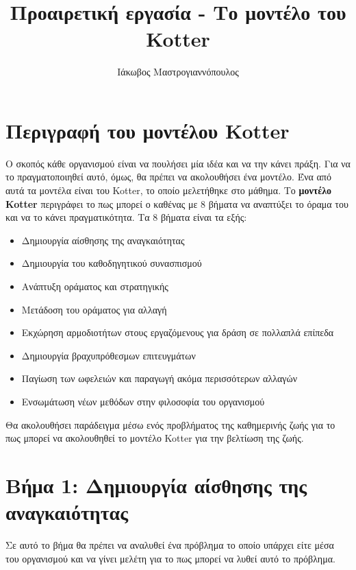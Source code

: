 \documentclass{fphw}
\title{Προαιρετική εργασία - Το μοντέλο του Kotter}
\author{Ιάκωβος Μαστρογιαννόπουλος}
\institute{Πανεπιστημιο Δυτικης Αττικης \\ Τμημα Πληροφορικης Και Υπολογιστων}
\begin{document}
    \maketitle

    \section*{Περιγραφή του μοντέλου Kotter}
    Ο σκοπός κάθε οργανισμού είναι να πουλήσει μία ιδέα και να την κάνει πράξη. Για να το πραγματοποιηθεί
    αυτό, όμως, θα πρέπει να ακολουθήσει ένα μοντέλο. Ένα από αυτά τα μοντέλα
    είναι του Kotter, το οποίο μελετήθηκε στο μάθημα.
    Το \textbf{μοντέλο Kotter} περιγράφει το πως μπορεί ο καθένας με 
    8 βήματα να αναπτύξει το όραμα του και να το κάνει πραγματικότητα.
    Τα 8 βήματα είναι τα εξής:
    \begin{itemize}
        \item Δημιουργία αίσθησης της αναγκαιότητας
        \item Δημιουργία του καθοδηγητικού συνασπισμού
        \item Ανάπτυξη οράματος και στρατηγικής
        \item Μετάδοση του οράματος για αλλαγή
        \item Εκχώρηση αρμοδιοτήτων στους εργαζόμενους για δράση σε πολλαπλά επίπεδα
        \item Δημιουργία βραχυπρόθεσμων επιτευγμάτων
        \item Παγίωση των ωφελειών και παραγωγή ακόμα περισσότερων αλλαγών
        \item Ενσωμάτωση νέων μεθόδων στην φιλοσοφία του οργανισμού
    \end{itemize}
    Θα ακολουθήσει παράδειγμα μέσω ενός προβλήματος της καθημερινής ζωής για το πως
    μπορεί να ακολουθηθεί το μοντέλο Kotter για την βελτίωση της ζωής.

    \section*{Βήμα 1: Δημιουργία αίσθησης της αναγκαιότητας}

    \begin{problem}
        Σε αυτό το βήμα θα πρέπει να αναλυθεί ένα πρόβλημα το οποίο υπάρχει
        είτε μέσα του οργανισμού και να γίνει μελέτη για το πως μπορεί να 
        λυθεί αυτό το πρόβλημα.
    \end{problem}
\end{document}
